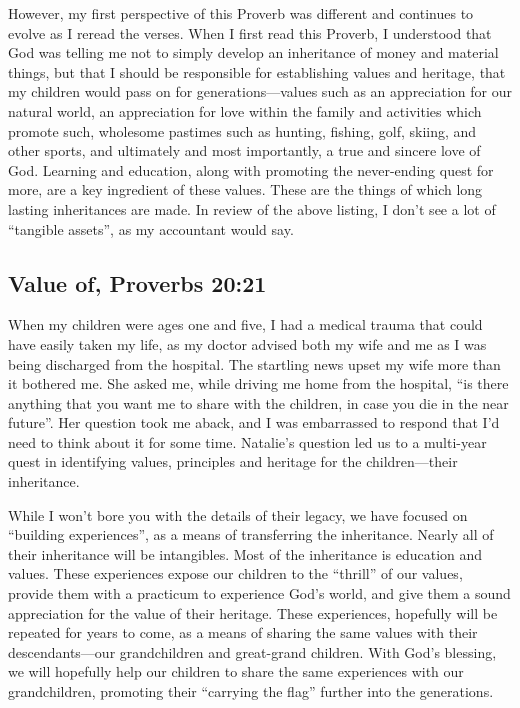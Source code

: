 \documentclass[12pt]{memoir}
\begin{document}
However, my first perspective of this Proverb was different and continues
to evolve as I reread the verses. When I first read this Proverb,
I understood that God was telling me not to simply develop an inheritance
of money and material things, but that I should be responsible for
establishing values and heritage, that my children would pass on for
generations---values such as an appreciation for our natural world,
an appreciation for love within the family and activities which promote
such, wholesome pastimes such as hunting, fishing, golf, skiing, and
other sports, and ultimately and most importantly, a true and sincere
love of God. Learning and education, along with promoting the never-ending
quest for more, are a key ingredient of these values. These are the
things of which long lasting inheritances are made. In review of the
above listing, I don't see a lot of ``tangible assets'', as my accountant
would say.

\subsection{Value of, Proverbs 20:21}

When my children were ages one and five, I had a medical trauma that
could have easily taken my life, as my doctor advised both my wife
and me as I was being discharged from the hospital. The startling
news upset my wife more than it bothered me. She asked me, while driving
me home from the hospital, ``is there anything that you want me to
share with the children, in case you die in the near future''. Her
question took me aback, and I was embarrassed to respond that I'd
need to think about it for some time. Natalie's question led us to
a multi-year quest in identifying values, principles and heritage
for the children---their inheritance.

While I won't bore you with the details of their legacy, we have focused
on ``building experiences'', as a means of transferring the inheritance.
Nearly all of their inheritance will be intangibles. Most of the inheritance
is education and values. These experiences expose our children to
the ``thrill'' of our values, provide them with a practicum to experience
God's world, and give them a sound appreciation for the value of their
heritage. These experiences, hopefully will be repeated for years
to come, as a means of sharing the same values with their descendants---our
grandchildren and great-grand children. With God's blessing, we will
hopefully help our children to share the same experiences with our
grandchildren, promoting their ``carrying the flag'' further into
the generations.
\end{document}
